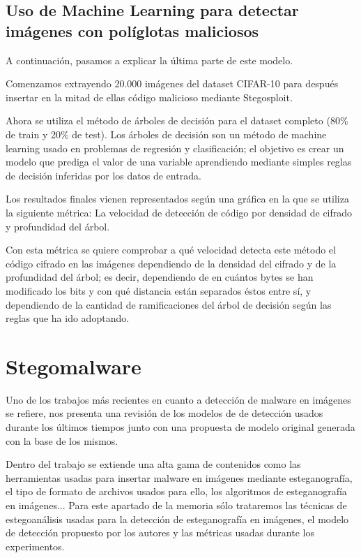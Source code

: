 \subsection{Uso de Machine Learning para detectar imágenes con políglotas maliciosos}

A continuación, pasamos a explicar la última parte de este modelo.

Comenzamos extrayendo 20.000 imágenes del dataset CIFAR-10 para después insertar en la mitad de ellas código malicioso mediante Stegosploit. %

Ahora se utiliza el método de árboles de decisión para el dataset completo (80\% de train y 20\% de test). Los árboles de decisión son un método de machine learning usado en problemas de regresión y clasificación; el objetivo es crear un modelo que prediga el valor de una variable aprendiendo mediante simples reglas de decisión inferidas por los datos de entrada. %

Los resultados finales vienen representados según una gráfica en la que se utiliza la siguiente métrica: La velocidad de detección de código por densidad de cifrado y profundidad del árbol.

Con esta métrica se quiere comprobar a qué velocidad detecta este método el código cifrado en las imágenes dependiendo de la densidad del cifrado y de la profundidad del árbol; es decir, dependiendo de en cuántos bytes se han modificado los bits y con qué distancia están separados éstos entre sí, y dependiendo de la cantidad de ramificaciones del árbol de decisión según las reglas que ha ido adoptando.

\section{Stegomalware}

Uno de los trabajos más recientes en cuanto a detección de malware en imágenes se refiere, nos presenta una revisión de los modelos de de detección usados durante los últimos tiempos junto con una propuesta de modelo original generada con la base de los mismos. %

Dentro del trabajo se extiende una alta gama de contenidos como las herramientas usadas para insertar malware en imágenes mediante esteganografía, el tipo de formato de archivos usados para ello, los algoritmos de esteganografía en imágenes... Para este apartado de la memoria sólo trataremos las técnicas de estegoanálisis usadas para la detección de esteganografía en imágenes, el modelo de detección propuesto por los autores y las métricas usadas durante los experimentos.

